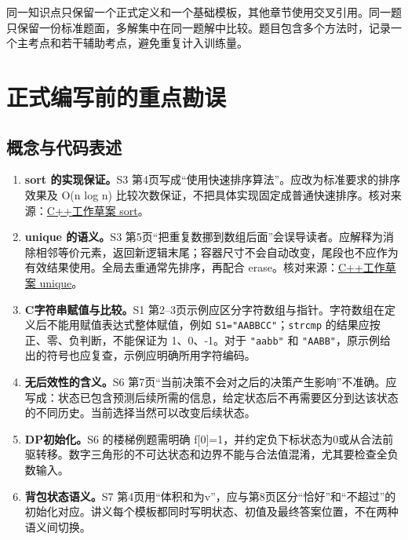 \documentclass[UTF8,11pt,a4paper,fontset=none]{ctexart}
\begin{document}
同一知识点只保留一个正式定义和一个基础模板，其他章节使用交叉引用。同一题只保留一份标准题面，多解集中在同一题解中比较。题目包含多个方法时，记录一个主考点和若干辅助考点，避免重复计入训练量。

\section{正式编写前的重点勘误}
\subsection{概念与代码表述}
\begin{enumerate}
\item \textbf{sort 的实现保证。}S3 第4页写成“使用快速排序算法”。应改为标准要求的排序效果及 O(n log n) 比较次数保证，不把具体实现固定成普通快速排序。核对来源：\href{https://eel.is/c++draft/sort}{C++工作草案 sort}。
\item \textbf{unique 的语义。}S3 第5页“把重复数挪到数组后面”会误导读者。应解释为消除相邻等价元素，返回新逻辑末尾；容器尺寸不会自动改变，尾段也不应作为有效结果使用。全局去重通常先排序，再配合 erase。核对来源：\href{https://eel.is/c++draft/alg.unique}{C++工作草案 unique}。
\item \textbf{C字符串赋值与比较。}S1 第2--3页示例应区分字符数组与指针。字符数组在定义后不能用赋值表达式整体赋值，例如 \texttt{S1="AABBCC"}；\texttt{strcmp} 的结果应按正、零、负判断，不能保证为 1、0、-1。对于 \texttt{"aabb"} 和 \texttt{"AABB"}，原示例给出的符号也应复查，示例应明确所用字符编码。
\item \textbf{无后效性的含义。}S6 第7页“当前决策不会对之后的决策产生影响”不准确。应写成：状态已包含预测后续所需的信息，给定状态后不再需要区分到达该状态的不同历史。当前选择当然可以改变后续状态。
\item \textbf{DP初始化。}S6 的楼梯例题需明确 f[0]=1，并约定负下标状态为0或从合法前驱转移。数字三角形的不可达状态和边界不能与合法值混淆，尤其要检查全负数输入。
\item \textbf{背包状态语义。}S7 第4页用“体积和为v”，应与第8页区分“恰好”和“不超过”的初始化对应。讲义每个模板都同时写明状态、初值及最终答案位置，不在两种语义间切换。
\end{enumerate}
\end{document}

